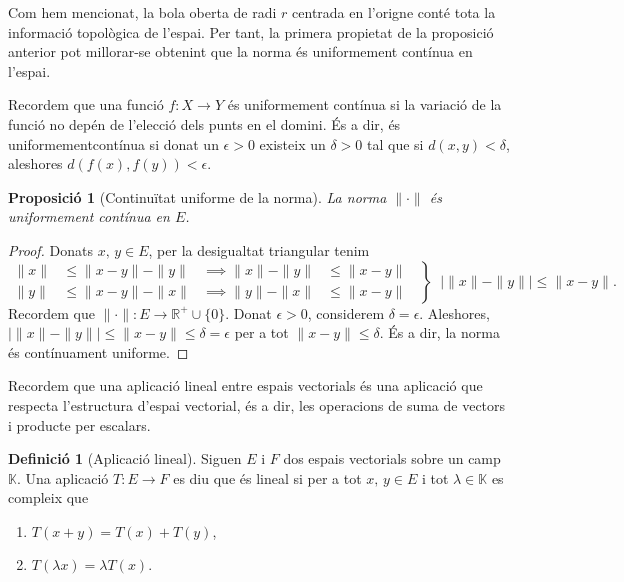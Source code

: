 \documentclass[12pt]{book}
\newtheorem{prop}[teorema]{Proposició}
\theoremstyle{definition}
\newtheorem{defi}[teorema]{Definició}
\theoremstyle{nota}
\theoremstyle{exemple}
\begin{document}
Com hem mencionat, la bola oberta de radi $r$ centrada en l'origne
conté tota la informació topològica de l'espai. Per tant, la primera
propietat de la proposició anterior pot millorar-se obtenint que la
norma és uniformement contínua en l'espai.

Recordem que una funció $f : X \to Y$ és uniformement contínua si la
variació de la funció no depén de l'elecció dels punts en el
domini. És a dir, és uniformementcontínua si donat un $\epsilon > 0$
existeix un $\delta > 0$ tal que si $d(x,y) < \delta$, aleshores
$d(f(x), f(y)) < \epsilon$.

\begin{prop}[Continuïtat uniforme de la norma]
  La norma $\|\cdot\|$ és uniformement contínua en $E$.
\end{prop}

\begin{proof}
  Donats $x, \, y \in E$, per la desigualtat triangular tenim
  \begin{equation*}
    \left.
      \begin{aligned}
        \|x\| &\leq \|x-y\| - \|y\| & \implies \|x\|-\|y\| &\leq \|x-y\| \\
        \|y\| &\leq \|x-y\| - \|x\| & \implies \|y\|-\|x\| &\leq \|x-y\|
      \end{aligned} \;\;
    \right\} \;\;
    \left| \|x\| - \|y\| \right| \leq \|x-y\|.
  \end{equation*}
  Recordem que $\|\cdot\| : E \to \mathbb{R}^+ \cup \{0\}$. Donat
  $\epsilon > 0$, considerem $\delta = \epsilon$. Aleshores,
  $\left| \|x\| - \|y\| \right| \leq \|x - y\| \leq \delta = \epsilon$
  per a tot $\|x-y\| \leq \delta$. És a dir, la norma és contínuament
  uniforme.
\end{proof}

Recordem que una aplicació lineal entre espais vectorials és una
aplicació que respecta l'estructura d'espai vectorial, és a dir, les
operacions de suma de vectors i producte per escalars.

\begin{defi}[Aplicació lineal]
  Siguen $E$ i $F$ dos espais vectorials sobre un camp
  $\mathbb{K}$. Una aplicació $T : E \to F$ es diu que és lineal si
  per a tot $x, \, y \in E$ i tot $\lambda \in \mathbb{K}$ es compleix
  que
  \begin{enumerate}[nosep]
  \item $T(x + y) = T(x) + T(y)$,
  \item $T(\lambda x) = \lambda T(x)$.
  \end{enumerate}
\end{defi}
\end{document}
